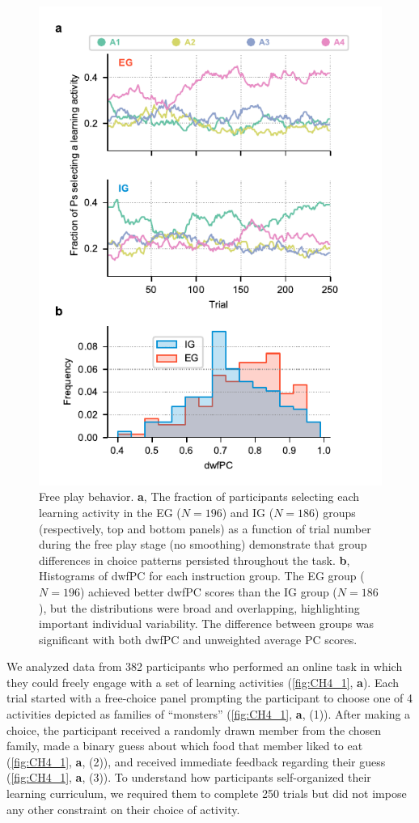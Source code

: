\begin{figure}[tbh]
    \center
    \includegraphics[width=.6\columnwidth]{Figures/c4/figure2.pdf}
    \caption[short description]{Free play behavior. \textbf{a}, The fraction of participants selecting each learning activity in the \ac{EG} ($N=196$) and \ac{IG} ($N=186$) groups (respectively, top and bottom panels) as a function of trial number during the free play stage (no smoothing) demonstrate that group differences in choice patterns persisted throughout the task. \textbf{b}, Histograms of \acf{dwfPC} for each instruction group. The \ac{EG} group ($N=196$) achieved better \ac{dwfPC} scores than the \ac{IG} group ($N=186$), but the distributions were broad and overlapping, highlighting important individual variability. The difference between groups was significant with both \ac{dwfPC} and unweighted average \ac{PC} scores.}
    \label{fig:CH4_2}
\end{figure}

We analyzed data from 382 participants who performed an online task in which they could freely engage with a set of learning activities (\cref{fig:CH4_1}, \textbf{a}). Each trial started with a free-choice panel prompting the participant to choose one of 4 activities depicted as families of “monsters” (\cref{fig:CH4_1}, \textbf{a}, (1)). After making a choice, the participant received a randomly drawn member from the chosen family, made a binary guess about which food that member liked to eat (\cref{fig:CH4_1}, \textbf{a}, (2)), and received immediate feedback regarding their guess (\cref{fig:CH4_1}, \textbf{a}, (3)). To understand how participants self-organized their learning curriculum, we required them to complete 250 trials but did not impose any other constraint on their choice of activity.

